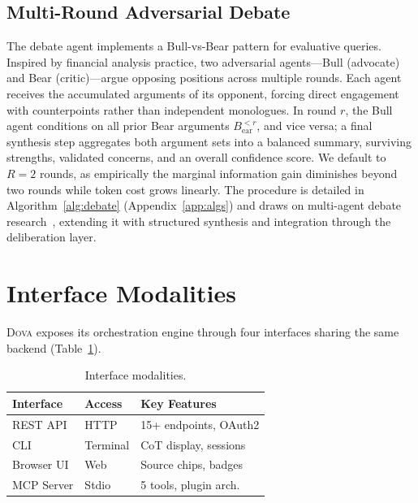 \documentclass{article}
\theoremstyle{plain}
\theoremstyle{definition}
\newcommand{\dova}{\textsc{Dova}}
\begin{document}
\subsection{Multi-Round Adversarial Debate}\label{sec:debate_algo}

The debate agent implements a Bull-vs-Bear pattern for evaluative queries.
Inspired by financial analysis practice, two adversarial agents---Bull
(advocate) and Bear (critic)---argue opposing positions across multiple rounds.
Each agent receives the accumulated arguments of its opponent, forcing direct
engagement with counterpoints rather than independent monologues.  In round
$r$, the Bull agent conditions on all prior Bear arguments
$B_\mathrm{ear}^{<r}$, and vice versa; a final synthesis step aggregates both
argument sets into a balanced summary, surviving strengths, validated concerns,
and an overall confidence score.  We default to $R{=}2$ rounds, as empirically
the marginal information gain diminishes beyond two rounds while token cost
grows linearly.  The procedure is detailed in Algorithm~\ref{alg:debate}
(Appendix~\ref{app:algs}) and draws on multi-agent debate
research~\citep{du2023debate,liang2023debate}, extending it with structured
synthesis and integration through the deliberation layer.

\section{Interface Modalities}\label{sec:interfaces}

\dova{} exposes its orchestration engine through four interfaces sharing the
same backend (Table~\ref{tab:interfaces}).

\begin{table}[t]
\caption{Interface modalities.}
\label{tab:interfaces}
\centering
\small
\begin{tabular}{@{}lll@{}}
\toprule
\textbf{Interface} & \textbf{Access} & \textbf{Key Features} \\
\midrule
REST API   & HTTP      & 15+ endpoints, OAuth2 \\
CLI        & Terminal  & CoT display, sessions \\
Browser UI & Web       & Source chips, badges \\
MCP Server & Stdio     & 5 tools, plugin arch. \\
\bottomrule
\end{tabular}
\end{table}
\end{document}
